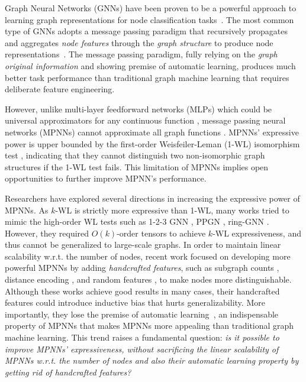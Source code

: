 \documentclass{article}
\theoremstyle{plain}
\begin{document}
Graph Neural Networks (GNNs) have been proven to be a powerful approach to learning graph representations for node classification tasks~\cite{hamilton2017inductive,klicpera2018predict,wu2019simplifying}.
The most common type of GNNs adopts a message passing paradigm that recursively propagates and aggregates \textit{node features} through the \textit{graph structure} to produce node representations~\cite{gilmer2017neural,battaglia2018relational}. 
The message passing paradigm, fully relying on the \textit{graph original information} and showing premise of automatic learning, produces much better task performance than traditional graph machine learning that requires deliberate feature engineering. 


However, unlike multi-layer feedforward networks (MLPs) which could be universal approximators for any continuous function \cite{hornik1989multilayer}, message passing neural networks (MPNNs) cannot approximate all graph functions \cite{maron2018invariant}. 
MPNNs' expressive power is upper bounded by the first-order Weisfeiler-Leman (1-WL) isomorphism test \cite{xu2018powerful}, indicating that they cannot distinguish two non-isomorphic graph structures if the 1-WL test fails. 
This limitation of MPNNs implies open opportunities to further improve MPNN's performance.  


Researchers have explored several directions in increasing the expressive power of MPNNs. 
As $k$-WL is strictly more expressive than 1-WL, many works tried to mimic the high-order WL tests such as 1-2-3 GNN \cite{morris2019weisfeiler}, PPGN \cite{maron2019provably}, ring-GNN \cite{chen2019equivalence}.
However, they required $O(k)$-order tensors to achieve $k$-WL expressiveness, and thus cannot be generalized to large-scale graphs. 
In order to maintain linear scalability w.r.t. the number of nodes, recent work focused on developing more powerful MPNNs by adding \textit{handcrafted features}, such as subgraph counts \cite{bouritsas2022improving}, distance encoding \cite{li2020distance}, and random features \cite{abboud2020surprising,sato2021random}, to make nodes more distinguishable. 
Although these works achieve good results in many cases, their handcrafted features could introduce inductive bias that hurts generalizability. 
More importantly, they lose the premise of automatic learning~\cite{zhao2021stars}, 
an indispensable property of MPNNs that makes MPNNs more appealing than traditional graph machine learning. 
This trend raises a fundamental question: \textit{is it possible to improve MPNNs' expressiveness, without sacrificing the linear scalability of MPNNs w.r.t. the number of nodes and also their automatic learning property by getting rid of handcrafted features?}
\end{document}
